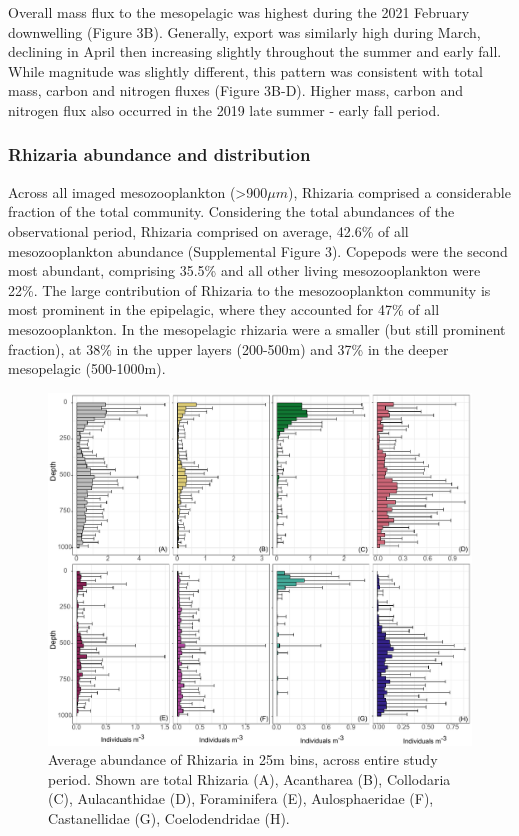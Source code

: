 \documentclass[
]{article}
\begin{document}
Overall mass flux to the mesopelagic was highest during the 2021
February downwelling (Figure 3B). Generally, export was similarly high
during March, declining in April then increasing slightly throughout the
summer and early fall. While magnitude was slightly different, this
pattern was consistent with total mass, carbon and nitrogen fluxes
(Figure 3B-D). Higher mass, carbon and nitrogen flux also occurred in
the 2019 late summer - early fall period.

\hypertarget{rhizaria-abundance-and-distribution}{%
\subsubsection{Rhizaria abundance and
distribution}\label{rhizaria-abundance-and-distribution}}

Across all imaged mesozooplankton (\textgreater900\(\mu m\)), Rhizaria
comprised a considerable fraction of the total community. Considering
the total abundances of the observational period, Rhizaria comprised on
average, 42.6\% of all mesozooplankton abundance (Supplemental Figure
3). Copepods were the second most abundant, comprising 35.5\% and all
other living mesozooplankton were 22\%. The large contribution of
Rhizaria to the mesozooplankton community is most prominent in the
epipelagic, where they accounted for 47\% of all mesozooplankton. In the
mesopelagic rhizaria were a smaller (but still prominent fraction), at
38\% in the upper layers (200-500m) and 37\% in the deeper mesopelagic
(500-1000m).

\begin{figure}

{\centering \includegraphics{images/04_vertical.pdf}

}

\caption{Average abundance of Rhizaria in 25m bins, across entire study
period. Shown are total Rhizaria (A), Acantharea (B), Collodaria (C),
Aulacanthidae (D), Foraminifera (E), Aulosphaeridae (F), Castanellidae
(G), Coelodendridae (H).}

\end{figure}
\end{document}
